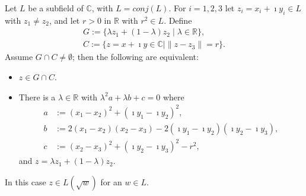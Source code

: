 \begin{lemma}
    \label{lem:ConjClosed.Intersection_line_circle}
    \leanok
    Let $L$ be a subfield of $\mathbb{C}$, with $L = conj(L)$. For $i = 1,2,3$ let $z_i = x_i + \imath y_i \in L$ with $z_1 \ne z_2$, and let $r > 0$ in $\mathbb{R}$ with $r^2 \in L$. Define
    \begin{equation*}\begin{aligned}
        G := \{\lambda z_1 + (1-\lambda)z_2 \mid \lambda \in \mathbb{R}\},\\
        C := \{z = x + \imath y \in \mathbb{C} \mid \|z - z_3\| = r\}.
    \end{aligned} \end{equation*}
    Assume $G \cap C \ne \emptyset$; then the following are equivalent:
    \begin{itemize}
        \item $z\in G \cap C$.
        \item There is a $\lambda \in \mathbb{R}$ with $\lambda^2 a+ \lambda b + c = 0$ where
        \begin{align*}
            a &:= (x_1 - x_2)^2 + (\imath y_1 - \imath y_2)^2,\\
            b &:= 2(x_1 - x_2)(x_2 - x_3) - 2(\imath y_1 - \imath y_2)(\imath y_2 - \imath y_3),\\
            c &:= (x_2 - x_3)^2 + (\imath y_2 - \imath y_3)^2 - r^2,
        \end{align*}
        and $z = \lambda z_1 + (1-\lambda)z_2$.
    \end{itemize}
    In this case $z \in L(\sqrt{w})$ for an $w \in L$.
\end{lemma}

